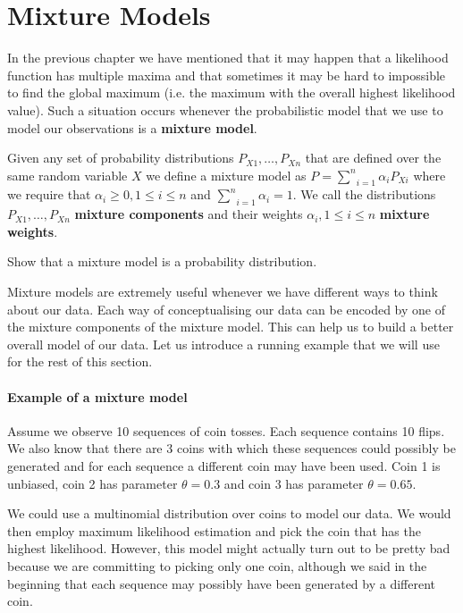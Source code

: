 \section{Mixture Models}

In the previous chapter we have mentioned that it may happen that a likelihood function has multiple 
maxima and that sometimes it may be hard to impossible to find the global maximum (i.e. the maximum
with the overall highest likelihood value). Such a situation occurs whenever the probabilistic model
that we use to model our observations is a \textbf{mixture model}.

\begin{Definition}
Given any set of probability distributions $ P_{X1}, \ldots, P_{Xn} $ that are defined over the same
random variable $ X $ we define a mixture model as
$ P = \underset{i=1}{\overset{n}{\sum}} \alpha_{i}P_{Xi} $
where we require that $ \alpha_{i} \geq 0, 1 \leq i \leq n $ and 
$ \underset{i=1}{\overset{n}{\sum}} \alpha_{i} = 1 $.
We call the distributions $ P_{X1}, \ldots, P_{Xn} $ \textbf{mixture components} and their weights
$ \alpha_{i}, 1 \leq i \leq n $ \textbf{mixture weights}.
\end{Definition}

\begin{Exercise}
Show that a mixture model is a probability distribution.
\end{Exercise}


Mixture models are extremely useful whenever we have different ways to think about our data. Each way
of conceptualising our data can be encoded by one of the mixture components of the mixture model.
This can help us to build a better overall model of our data. Let us introduce a running example that
we will use for the rest of this section. 

\paragraph{Example of a mixture model} Assume we observe 10 sequences of coin tosses. Each sequence
contains 10 flips. We also know that there are 3 coins with which these sequences could possibly be
generated and for each sequence a different coin may have been used. Coin 1 is unbiased, coin 2 has
parameter $ \theta = 0.3 $ and coin 3 has parameter $ \theta = 0.65 $. 
 
We could use 
a multinomial distribution over coins to model our data. We would then employ maximum likelihood estimation 
and pick the coin that has the highest likelihood. However, this model might actually turn out to be
pretty bad because we are committing to picking only one coin, although we said in the beginning that
each sequence may possibly have been generated by a different coin. 


